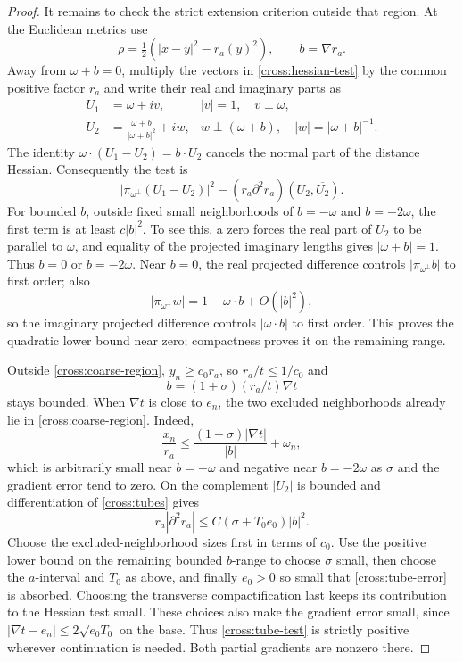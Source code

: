 \documentclass[11pt]{article}
\theoremstyle{definition}
\theoremstyle{remark}
\numberwithin{equation}{section}
\begin{document}
\begin{proof}
It remains to check the strict extension criterion outside that region.
At the Euclidean metrics use
\[
 \rho=\tfrac12(|x-y|^2-r_a(y)^2),\qquad b=\nabla r_a.
\]
Away from $\omega+b=0$, multiply the vectors in
\eqref{cross:hessian-test} by the common positive factor $r_a$ and
write their real and imaginary parts as
\begin{equation}\label{cross:null-vectors}
 \begin{aligned}
 U_1&=\omega+iv,& |v|=1,\quad v\perp\omega,\\
 U_2&=\frac{\omega+b}{|\omega+b|^2}+iw,
 &w\perp(\omega+b),\quad |w|=|\omega+b|^{-1}.
 \end{aligned}
\end{equation}
The identity $\omega\cdot(U_1-U_2)=b\cdot U_2$ cancels the normal
part of the distance Hessian.  Consequently the test is
\begin{equation}\label{cross:tube-test}
 \big|\pi_{\omega^\perp}(U_1-U_2)\big|^2
 -(r_a\partial^2r_a)(U_2,\overline{U_2}).
\end{equation}
For bounded $b$, outside fixed small neighborhoods of
$b=-\omega$ and $b=-2\omega$, the first term is at least $c|b|^2$.
To see this, a zero forces the real part of $U_2$ to be parallel to
$\omega$, and equality of the projected imaginary lengths gives
$|\omega+b|=1$.  Thus $b=0$ or $b=-2\omega$.
Near $b=0$, the real projected difference controls
$|\pi_{\omega^\perp}b|$ to first order; also
\[
 |\pi_{\omega^\perp}w|
 =1-\omega\cdot b+O(|b|^2),
\]
so the imaginary projected difference controls $|\omega\cdot b|$
to first order.  This proves the quadratic lower bound near zero;
compactness proves it on the remaining range.

Outside \eqref{cross:coarse-region}, $y_n\ge c_0r_a$, so
$r_a/t\le1/c_0$ and
\[
 b=(1+\sigma)(r_a/t)\nabla t
\]
stays bounded.  When $\nabla t$ is close to $e_n$, the two excluded
neighborhoods already lie in \eqref{cross:coarse-region}.  Indeed,
\[
 \frac{x_n}{r_a}
 \le \frac{(1+\sigma)|\nabla t|}{|b|}+\omega_n,
\]
which is arbitrarily small near $b=-\omega$ and negative near
$b=-2\omega$ as $\sigma$ and the gradient error tend to zero.
On the complement $|U_2|$ is bounded and differentiation of
\eqref{cross:tubes} gives
\begin{equation}\label{cross:tube-error}
 r_a|\partial^2r_a|
 \le C(\sigma+T_0e_0)|b|^2.
\end{equation}
Choose the excluded-neighborhood sizes first in terms of $c_0$.
Use the positive lower bound on the remaining bounded $b$-range to
choose $\sigma$ small, then choose the $a$-interval and $T_0$ as above,
and finally $e_0>0$ so small that \eqref{cross:tube-error} is absorbed.
Choosing the transverse compactification last keeps its contribution
to the Hessian test small. These choices also make the gradient error small, since
$|\nabla t-e_n|\le2\sqrt{e_0T_0}$ on the base.
Thus \eqref{cross:tube-test} is strictly positive wherever continuation
is needed.  Both partial gradients are nonzero there.


\end{proof}
\end{document}
